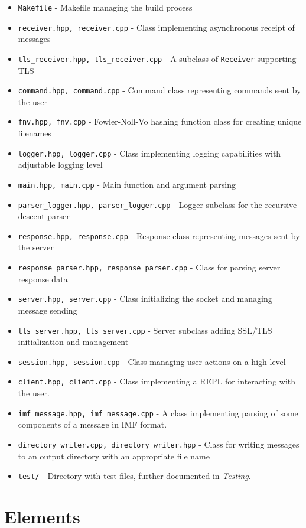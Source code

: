 \documentclass[a4]{report}
\begin{document}
\begin{itemize}
\item \texttt{Makefile} - Makefile managing the build process
\item \texttt{receiver.hpp, receiver.cpp} - Class implementing asynchronous receipt of messages
\item \texttt{tls\_receiver.hpp, tls\_receiver.cpp} - A subclass of \texttt{Receiver} supporting TLS
\item \texttt{command.hpp, command.cpp} - Command class representing commands sent by the user
\item \texttt{fnv.hpp, fnv.cpp} - Fowler-Noll-Vo\cite{eastlake-fnv-29} hashing function class for creating unique filenames
\item \texttt{logger.hpp, logger.cpp} - Class implementing logging capabilities with adjustable logging level
\item \texttt{main.hpp, main.cpp} - Main function and argument parsing
\item \texttt{parser\_logger.hpp, parser\_logger.cpp} - Logger subclass for the recursive descent parser
\item \texttt{response.hpp, response.cpp} - Response class representing messages sent by the server
\item \texttt{response\_parser.hpp, response\_parser.cpp} - Class for parsing server response data
\item \texttt{server.hpp, server.cpp} - Class initializing the socket and managing message sending
\item \texttt{tls\_server.hpp, tls\_server.cpp} - Server subclass adding SSL/TLS initialization and management
\item \texttt{session.hpp, session.cpp} - Class managing user actions on a high level
\item \texttt{client.hpp, client.cpp} - Class implementing a REPL for interacting with the user.
\item \texttt{imf\_message.hpp, imf\_message.cpp} - A class implementing parsing of some components of a message in IMF format.
\item \texttt{directory\_writer.cpp, directory\_writer.hpp} - Class for writing messages to an output directory with an appropriate file name
\item \texttt{test/} - Directory with test files, further documented in \textit{Testing}.
\end{itemize}

\section{Elements}
\end{document}
